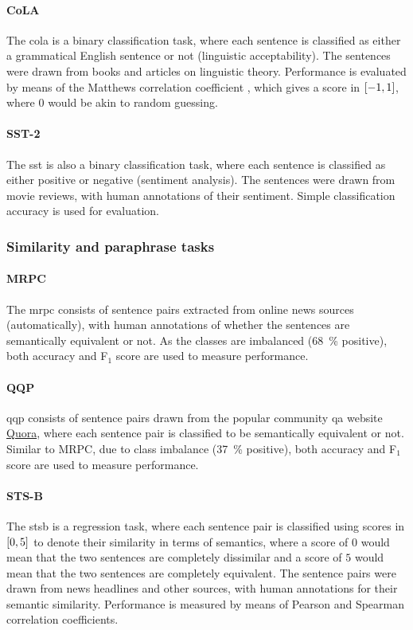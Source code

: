 \paragraph{CoLA}
The \gls{cola} \citep{warstadt2019neural} is a binary classification task, where each sentence is classified as either a grammatical English sentence or not (linguistic acceptability). The sentences were drawn from books and articles on linguistic theory. Performance is evaluated by means of the Matthews correlation coefficient \citep{matthews1975comparison}, which gives a score in $\left[{-1, 1}\right]$, where $0$ would be akin to random guessing.

\paragraph{SST-2}
The \gls{sst} \citep{socher2013recursive} is also a binary classification task, where each sentence is classified as either positive or negative (sentiment analysis). The sentences were drawn from movie reviews, with human annotations of their sentiment. Simple classification accuracy is used for evaluation.

\subsubsection{Similarity and paraphrase tasks}
\paragraph{MRPC}
The \gls{mrpc} \citep{dolan2005automatically} consists of sentence pairs extracted from online news sources (automatically), with human annotations of whether the sentences are semantically equivalent or not. As the classes are imbalanced (\SI{68}{\percent} positive), both accuracy and F$_{\text{1}}$ score are used to measure performance.

\paragraph{QQP}
\gls{qqp} \citep{iyer2018quora} consists of sentence pairs drawn from the popular community \gls{qa} website \href{https://www.quora.com}{Quora}, where each sentence pair is classified to be semantically equivalent or not. Similar to MRPC, due to class imbalance (\SI{37}{\percent} positive), both accuracy and F$_{\text{1}}$ score are used to measure performance.

\paragraph{STS-B}
The \gls{stsb} \citep{cer2017semeval} is a regression task, where each sentence pair is classified using scores in $\left[{0, 5}\right]$ to denote their similarity in terms of semantics, where a score of $0$ would mean that the two sentences are completely dissimilar and a score of $5$ would mean that the two sentences are completely equivalent. The sentence pairs were drawn from news headlines and other sources, with human annotations for their semantic similarity. Performance is measured by means of Pearson and Spearman correlation coefficients.


